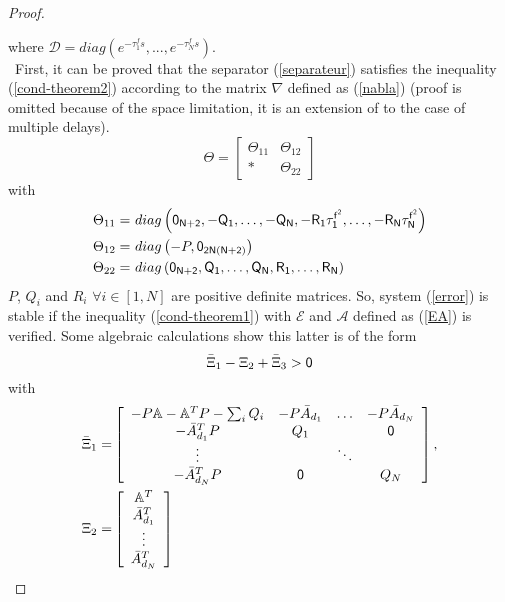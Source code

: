 \documentclass[a4paper, 10pt, onecolumn]{article}
\newtheorem{proof}{Proof}
\begin{document}
\begin{proof}
\begin{table*}
\begin{equation}
\end{equation}
\end{table*}
where $\mathcal{D}=diag\left(e^{-\tau_1^fs},...,e^{-\tau_N^fs}\right).$\\
~\indent First, it can be proved that the separator (\ref{separateur}) satisfies the inequality (\ref{cond-theorem2}) according to the matrix $\nabla$ defined as (\ref{nabla}) (proof is omitted because of the space limitation, it is an extension of \cite{Gou06a} to the case of multiple delays).
\begin{equation}
\label{separateur}
\Theta=\left[\begin{array}{c|c}\Theta_{11}&\Theta_{12}\\ \hline \ast &\Theta_{22}\end{array}\right]
\end{equation}
with
\begin{equation*}
\begin{aligned}
\Theta_{11}=& ~diag\left(\sf{0}_{N+2},-Q_1,\ldots,-Q_N,-R_1\tau_1^{f^2},\ldots,-R_N\tau_N^{f^2}\right)\\
\Theta_{12}=& ~diag\left(-P,\sf{0}_{2N(N+2)}\right)\\
\Theta_{22}=& ~diag\left(\sf{0}_{N+2},Q_1,\ldots,Q_N,R_1,\ldots,R_N\right)
\end{aligned}
\end{equation*}
$P$, $Q_i$ and $R_i$ $\forall i\in[1,N]$ are positive definite matrices. So, system (\ref{error}) is stable if the inequality (\ref{cond-theorem1}) with $\mathcal{E}$ and $\mathcal{A}$ defined as (\ref{EA}) is verified. Some algebraic calculations show this latter is of the form
\begin{equation}
\label{proof-cond}
\bar \Xi_1-\Xi_2+\bar\Xi_3>\sf{0}
\end{equation}
with
\begin{equation*}
\begin{aligned}
\bar\Xi_1=&\left[\begin{array}{cccc}-P\mathbb{A}-\mathbb{A}^TP-\sum_iQ_i&-P\bar{A}_{d_1}&\ldots&-P\bar{A}_{d_N}\\-\bar{A}^T_{d_1}P&Q_1&&\sf{0}\\ \vdots &&\ddots&\\-\bar{A}^T_{d_N}P&\sf{0}&&Q_N \end{array}\right],\\
\Xi_2=&\left[\begin{array}{c}\mathbb{A}^T\\\bar{A}^T_{d_1}\\ \vdots\\\bar{A}^T_{d_N}\end{array}\right]

\end{aligned}
\end{equation*}
\end{proof}
\end{document}
